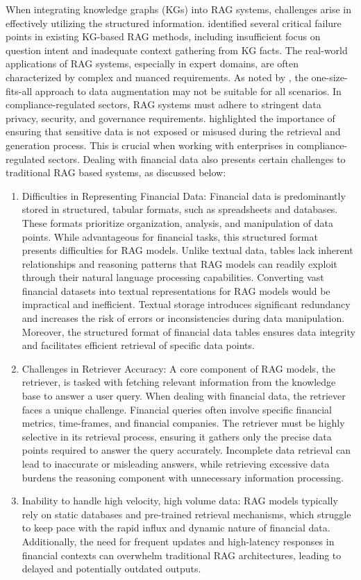 When integrating knowledge graphs (KGs) into RAG systems, challenges arise in effectively utilizing the structured information. 
\cite{agrawal2024mindful} identified several critical failure points in existing KG-based RAG methods, including insufficient focus on question intent and inadequate context gathering from KG facts. The real-world applications of RAG systems, especially in expert domains, are often characterized by complex and nuanced requirements. As noted by \cite{zhao2024retrieval}, the one-size-fits-all approach to data augmentation may not be suitable for all scenarios. In compliance-regulated sectors, RAG systems must adhere to stringent data privacy, security, and governance requirements. 
\cite{bruckhaus2024rag} highlighted the importance of ensuring that sensitive data is not exposed or misused during the retrieval and generation process. This is crucial when working with enterprises in compliance-regulated sectors. Dealing with financial data also presents certain challenges to traditional RAG based systems, as discussed below:
\begin{enumerate}
    \item Difficulties in Representing Financial Data: Financial data is predominantly stored in structured, tabular formats, such as spreadsheets and databases. These formats prioritize organization, analysis, and manipulation of data points. While advantageous for financial tasks, this structured format presents difficulties for RAG models. Unlike textual data, tables lack inherent relationships and reasoning patterns that RAG models can readily exploit through their natural language processing capabilities. Converting vast financial datasets into textual representations for RAG models would be impractical and inefficient. Textual storage introduces significant redundancy and increases the risk of errors or inconsistencies during data manipulation. Moreover, the structured format of financial data tables ensures data integrity and facilitates efficient retrieval of specific data points.
    \item Challenges in Retriever Accuracy: A core component of RAG models, the retriever, is tasked with fetching relevant information from the knowledge base to answer a user query. When dealing with financial data, the retriever faces a unique challenge. Financial queries often involve specific financial metrics, time-frames, and financial companies. The retriever must be highly selective in its retrieval process, ensuring it gathers only the precise data points required to answer the query accurately. Incomplete data retrieval can lead to inaccurate or misleading answers, while retrieving excessive data burdens the reasoning component with unnecessary information processing.
    \item Inability to handle high velocity, high volume data: RAG models typically rely on static databases and pre-trained retrieval mechanisms, which struggle to keep pace with the rapid influx and dynamic nature of financial data. Additionally, the need for frequent updates and high-latency responses in financial contexts can overwhelm traditional RAG architectures, leading to delayed and potentially outdated outputs.
\end{enumerate}

